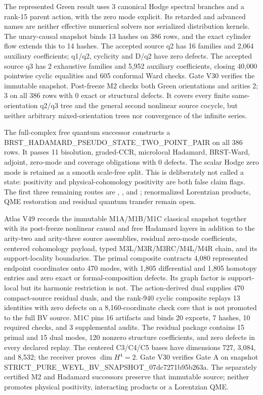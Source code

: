 The represented Green result uses 3 canonical Hodge spectral branches and a rank-15 parent action, with the zero mode explicit.  Its retarded and advanced names are neither effective numerical solvers nor serialized distribution kernels.  The unary-causal snapshot binds 13 hashes on 386 rows, and the exact cylinder flow extends this to 14 hashes.  The accepted source q2 has 16 families and 2,064 auxiliary coefficients; q1/q2, cyclicity and D/q2 have zero defects.  The accepted source q3 has 2 exhaustive families and 5,952 auxiliary coefficients, closing 40,000 pointwise cyclic equalities and 605 conformal Ward checks.  Gate V30 verifies the immutable snapshot.  Post-freeze M2 checks both Green orientations and arities 2; 3 on all 386 rows with 0 exact or structural defects.  It covers every finite same-orientation q2/q3 tree and the general second nonlinear source cocycle, but neither arbitrary mixed-orientation trees nor convergence of the infinite series.

The full-complex free quantum successor constructs a BRST\_HADAMARD\_PSEUDO\_STATE\_TWO\_POINT\_PAIR on all 386 rows.  It passes 11 bisolution, graded-CCR, microlocal Hadamard, BRST-Ward, adjoint, zero-mode and coverage obligations with 0 defects.  The scalar Hodge zero mode is retained as a smooth scale-free split.  This is deliberately not called a state: positivity and physical-cohomology positivity are both false claim flags.  The first three remaining routes are , , and ; renormalized Lorentzian products, QME restoration and residual quantum transfer remain open.

Atlas V49 records the immutable M1A/M1B/M1C classical snapshot together with its post-freeze nonlinear causal and free Hadamard layers in addition to the arity-two and arity-three source assemblies, residual zero-mode coefficients, centered cohomology payload, typed M3L/M3R/M3RC/M4L/M4R chain, and its support-locality boundaries.  The primal composite contracts 4,080 represented endpoint coordinates onto 470 modes, with 1,805 differential and 1,805 homotopy entries and zero exact or formal-composition defects.  Its graph factor is support-local but its harmonic restriction is not.  The action-derived dual supplies 470 compact-source residual duals, and the rank-940 cyclic composite replays 13 identities with zero defects on a 8,160-coordinate check core that is not promoted to the full BV source.  M1C pins 16 artifacts and binds 20 exports, 7 hashes, 10 required checks, and 3 supplemental audits.  The residual package contains 15 primal and 15 dual modes, 120 nonzero structure coefficients, and zero defects in every declared replay.  The centered C3/C4/C5 bases have dimensions 727, 3,084, and 8,532; the receiver proves \(\dim H^4=2\).  Gate V30 verifies Gate A on snapshot STRICT\_PURE\_WEYL\_BV\_SNAPSHOT\_07dc7271b95b263a.  The separately certified M2 and Hadamard successors preserve that immutable source; neither promotes physical positivity, interacting products or a Lorentzian QME.

